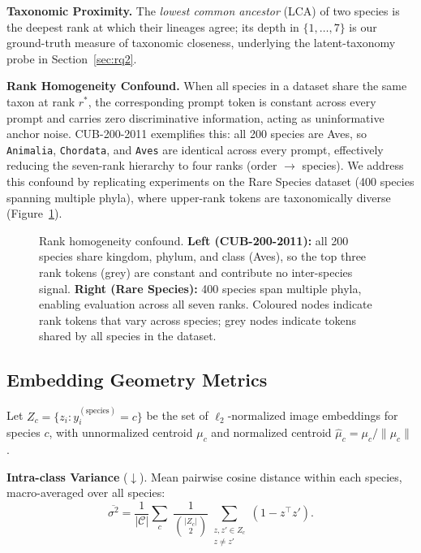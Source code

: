 \noindent\textbf{Taxonomic Proximity.}
The \emph{lowest common ancestor} (LCA) of two species is the deepest rank at which
their lineages agree; its depth in $\{1,\dots,7\}$ is our ground-truth measure of
taxonomic closeness, underlying the latent-taxonomy probe in
Section~\ref{sec:rq2}.

\noindent\textbf{Rank Homogeneity Confound.}
When all species in a dataset share the same taxon at rank $r^{*}$, the corresponding
prompt token is constant across every prompt and carries zero discriminative
information, acting as uninformative anchor noise.
CUB-200-2011 exemplifies this: all 200 species are Aves, so
\texttt{Animalia}, \texttt{Chordata}, and \texttt{Aves} are identical across every
prompt, effectively reducing the seven-rank hierarchy to four ranks
(order $\to$ species).
We address this confound by replicating experiments on the Rare Species dataset
(400 species spanning multiple phyla), where upper-rank tokens are taxonomically
diverse (Figure~\ref{fig:rank_homogeneity}).

\begin{figure}[t]
  \centering
  \caption{Rank homogeneity confound.
           \textbf{Left (CUB-200-2011):} all 200 species share kingdom, phylum, and
           class (Aves), so the top three rank tokens (grey) are constant and
           contribute no inter-species signal.
           \textbf{Right (Rare Species):} 400 species span multiple phyla, enabling
           evaluation across all seven ranks.
           Coloured nodes indicate rank tokens that vary across species;
           grey nodes indicate tokens shared by all species in the dataset.}
  \label{fig:rank_homogeneity}
\end{figure}

\subsection{Embedding Geometry Metrics}
\label{sec:geometry_metrics}

Let $Z_c = \{z_i : y_i^{(\mathrm{species})} = c\}$ be the set of $\ell_2$-normalized
image embeddings for species $c$, with unnormalized centroid $\mu_c$ and normalized
centroid $\hat{\mu}_c = \mu_c / \|\mu_c\|$.

\noindent\textbf{Intra-class Variance} ($\downarrow$).
Mean pairwise cosine distance within each species, macro-averaged over all species:
\begin{equation}
\overline{\sigma^2}
= \frac{1}{|\mathcal{C}|}
  \sum_{c}\;
  \frac{1}{\binom{|Z_c|}{2}}
  \sum_{\substack{z,z'\in Z_c \\ z\neq z'}}
  (1 - z^{\top}z').
\label{eq:intra_var}
\end{equation}

